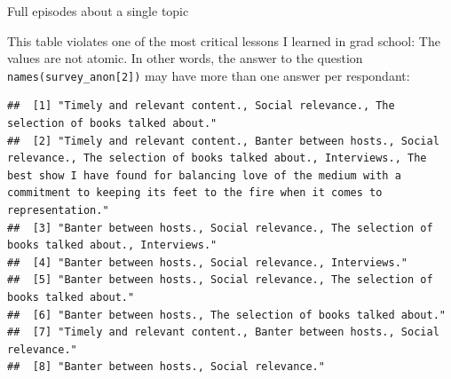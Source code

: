\documentclass[]{article}
\begin{document}
Full episodes about a single topic

This table violates one of the most critical lessons I learned in grad
school: The values are not atomic. In other words, the answer to the
question \texttt{names(survey\_anon{[}2{]})} may have more than one
answer per respondant:

\begin{verbatim}
##  [1] "Timely and relevant content., Social relevance., The selection of books talked about."                                                                                                                                                                                    
##  [2] "Timely and relevant content., Banter between hosts., Social relevance., The selection of books talked about., Interviews., The best show I have found for balancing love of the medium with a commitment to keeping its feet to the fire when it comes to representation."
##  [3] "Banter between hosts., Social relevance., The selection of books talked about., Interviews."                                                                                                                                                                              
##  [4] "Banter between hosts., Social relevance., Interviews."                                                                                                                                                                                                                    
##  [5] "Banter between hosts., Social relevance., The selection of books talked about."                                                                                                                                                                                           
##  [6] "Banter between hosts., The selection of books talked about."                                                                                                                                                                                                              
##  [7] "Timely and relevant content., Banter between hosts., Social relevance."                                                                                                                                                                                                   
##  [8] "Banter between hosts., Social relevance."                                                                                                                                                                                                                                 

\end{verbatim}
\end{document}
